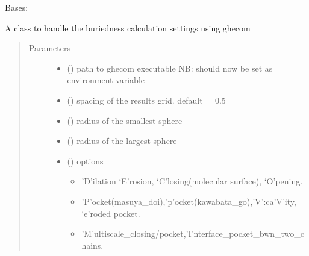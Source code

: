 \documentclass[letterpaper,10pt,english]{sphinxmanual}
\begin{document}
\begin{fulllineitems}
\begin{fulllineitems}
\label{\detokenize{calculation_api:hotspots.calculation.Buriedness.Settings}}
Bases: 

A class to handle the buriedness calculation settings using ghecom
\begin{quote}\begin{description}
\item[{Parameters}] \leavevmode\begin{itemize}
\item {} 
 () \textendash{} path to ghecom executable NB: should now be set as environment variable

\item {} 
 () \textendash{} spacing of the results grid. default = 0.5

\item {} 
 () \textendash{} radius of the smallest sphere

\item {} 
 () \textendash{} radius of the largest sphere

\item {} 
 () \textendash{} 
options
\begin{itemize}
\item {} 
’D’ilation ‘E’rosion, ‘C’losing(molecular surface), ‘O’pening.

\item {} 
’P’ocket(masuya\_doi),’p’ocket(kawabata\_go),’V’:ca’V’ity, ‘e’roded pocket.

\item {} 
’M’ultiscale\_closing/pocket,’I’nterface\_pocket\_bwn\_two\_chains.


\end{itemize}
\end{itemize}
\end{description}
\end{quote}
\end{fulllineitems}
\end{fulllineitems}
\end{document}
